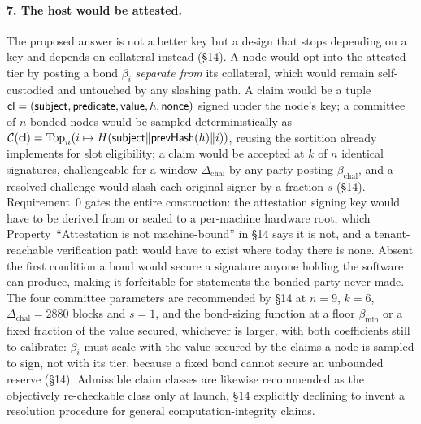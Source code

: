 \paragraph{7. The host would be attested.}
The proposed answer is not a better key but a design that stops depending on a key and depends on
collateral instead (\S14). A node would opt into the attested tier by posting a bond $\beta_i$
\emph{separate from} its \FluxNode collateral, which would remain self-custodied and untouched by any
slashing path. A claim would be a tuple
$\mathsf{cl} = (\mathsf{subject}, \mathsf{predicate}, \mathsf{value}, h, \mathsf{nonce})$ signed under
the node's key; a committee of $n$ bonded nodes would be sampled deterministically as
$\mathcal{C}(\mathsf{cl}) = \mathrm{Top}_n(i \mapsto H(\mathsf{subject} \| \mathsf{prevHash}(h) \| i))$,
reusing the sortition \fluxd already implements for \PoN slot eligibility; a claim would be accepted
at $k$ of $n$ identical signatures, challengeable for a window $\Delta_{\mathrm{chal}}$ by any party
posting $\beta_{\mathrm{chal}}$, and a resolved challenge would slash each original signer by a
fraction $s$ (\S14). Requirement~0 gates the entire construction: the attestation signing key would
have to be derived from or sealed to a per-machine hardware root, which
Property~``Attestation is not machine-bound'' in \S14 says it is not, and a tenant-reachable
verification path would have to exist where today there is none. Absent the first condition a bond
would secure a signature anyone holding the software can produce, making it forfeitable for
statements the bonded party never made. The four committee parameters are recommended by \S14 at
$n = 9$, $k = 6$, $\Delta_{\mathrm{chal}} = \num{2880}$ blocks and $s = 1$, and the bond-sizing
function at a floor $\beta_{\min}$ or a fixed fraction of the value secured, whichever is larger,
with both coefficients still to calibrate: $\beta_i$ must scale with the value secured by the claims
a node is sampled to sign, not with its \FluxNode tier, because a fixed bond cannot secure an
unbounded reserve (\S14). Admissible claim classes are likewise recommended as the objectively
re-checkable class only at launch, \S14 explicitly declining to invent a resolution procedure for
general computation-integrity claims.

